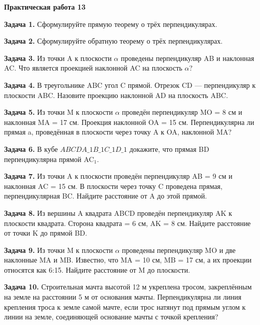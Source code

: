 \documentclass{umk-matematika}
\begin{document}
\begin{center}
{\Large\bfseries Практическая работа 13}
\end{center}
\vspace{0.5cm}

\textbf{Задача 1.} Сформулируйте прямую теорему о трёх перпендикулярах.\par\vspace{10pt}
\textbf{Задача 2.} Сформулируйте обратную теорему о трёх перпендикулярах.\par\vspace{10pt}
\textbf{Задача 3.} Из точки A к плоскости $\alpha$ проведены перпендикуляр AB и наклонная AC. Что является проекцией наклонной AC на плоскость $\alpha$?\par\vspace{10pt}
\textbf{Задача 4.} В треугольнике ABC угол C прямой. Отрезок CD — перпендикуляр к плоскости ABC. Назовите проекцию наклонной AD на плоскость ABC.\par\vspace{10pt}
\textbf{Задача 5.} Из точки M к плоскости $\alpha$ проведён перпендикуляр MO = 8 см и наклонная MA = 17 см. Проекция наклонной OA = 15 см. Перпендикулярна ли прямая a, проведённая в плоскости через точку A к OA, наклонной MA?\par\vspace{10pt}
\textbf{Задача 6.} В кубе $ABCDA\_1B\_1C\_1D\_1$ докажите, что прямая BD перпендикулярна прямой AC$_1$.\par\vspace{10pt}
\textbf{Задача 7.} Из точки A к плоскости проведён перпендикуляр AB = 9 см и наклонная AC = 15 см. В плоскости через точку C проведена прямая, перпендикулярная BC. Найдите расстояние от A до этой прямой.\par\vspace{10pt}
\textbf{Задача 8.} Из вершины A квадрата ABCD проведён перпендикуляр AK к плоскости квадрата. Сторона квадрата = 6 см, AK = 8 см. Найдите расстояние от точки K до прямой BD.\par\vspace{10pt}
\textbf{Задача 9.} Из точки M к плоскости $\alpha$ проведены перпендикуляр MO и две наклонные MA и MB. Известно, что MA = 10 см, MB = 17 см, а их проекции относятся как 6:15. Найдите расстояние от M до плоскости.\par\vspace{10pt}
\textbf{Задача 10.} Строительная мачта высотой 12 м укреплена тросом, закреплённым на земле на расстоянии 5 м от основания мачты. Перпендикулярна ли линия крепления троса к земле самой мачте, если трос натянут под прямым углом к линии на земле, соединяющей основание мачты с точкой крепления?\par\vspace{10pt}
\newpage
\end{document}
